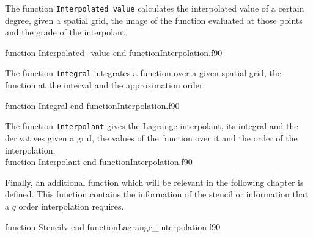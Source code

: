      \newpage
     The function \texttt{Interpolated\_value} calculates the interpolated value of a certain degree, given a spatial grid, the image of the function evaluated at those points and the grade of the interpolant. 
     
     \vspace{0.5cm} 
     {function Interpolated_value}
     {end function}{Interpolation.f90}
     
     \newpage 
     The function \texttt{Integral} integrates a function over a given spatial grid, the function at the interval and the approximation order.   
     
     \vspace{0.5cm} 
     {function Integral}
     {end function}{Interpolation.f90}
    
     
    \newpage
     The function \texttt{Interpolant} gives the Lagrange interpolant, its integral and the derivatives given a grid, the values of the function over it and the order of the interpolation.\\
     
     \vspace{0.5cm} 
     {function Interpolant}
     {end function}{Interpolation.f90}
     \vspace{0.5cm}
     
     Finally, an additional function which will be relevant in the following chapter is defined. This function contains the information of the stencil or information that a $q$ order interpolation requires.
     
     \vspace{0.5cm} 
     {function Stencilv}
     {end function}{Lagrange_interpolation.f90}
     
     